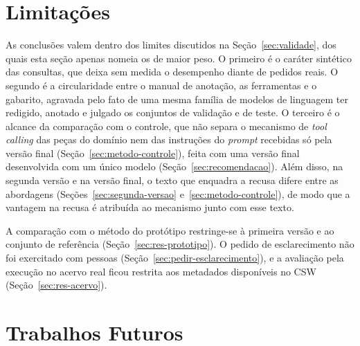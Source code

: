 \section{Limitações}
\label{sec:limitacoes}

As conclusões valem dentro dos limites discutidos na Seção~\ref{sec:validade}, dos quais esta seção apenas nomeia os de maior peso. O primeiro é o caráter sintético das consultas, que deixa sem medida o desempenho diante de pedidos reais. O segundo é a circularidade entre o manual de anotação, as ferramentas e o gabarito, agravada pelo fato de uma mesma família de modelos de linguagem ter redigido, anotado e julgado os conjuntos de validação e de teste. O terceiro é o alcance da comparação com o controle, que não separa o mecanismo de \textit{tool calling} das peças do domínio nem das instruções do \textit{prompt} recebidas só pela versão final (Seção~\ref{sec:metodo-controle}), feita com uma versão final desenvolvida com um único modelo (Seção~\ref{sec:recomendacao}). Além disso, na segunda versão e na versão final, o texto que enquadra a recusa difere entre as abordagens (Seções~\ref{sec:segunda-versao} e~\ref{sec:metodo-controle}), de modo que a vantagem na recusa é atribuída ao mecanismo junto com esse texto.

A comparação com o método do protótipo restringe-se à primeira versão e ao conjunto de referência (Seção~\ref{sec:res-prototipo}). O pedido de esclarecimento não foi exercitado com pessoas (Seção~\ref{sec:pedir-esclarecimento}), e a avaliação pela execução no acervo real ficou restrita aos metadados disponíveis no CSW (Seção~\ref{sec:res-acervo}).

\section{Trabalhos Futuros}
\label{sec:trabalhos-futuros}

